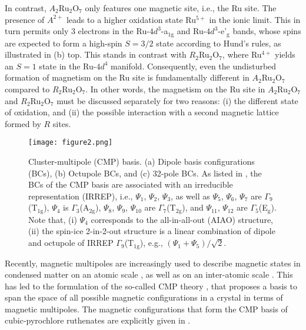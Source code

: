 \documentclass[10pt]{iopart}
\begin{document}
In contrast, $A_2$Ru$_2$O$_7$ only features one magnetic site, i.e., the Ru site. 
The presence of $A^{2+}$ leads to a higher oxidation state Ru$^{5+}$ in the ionic limit. This in turn permits only $3$ electrons in the Ru-$4d^3$-a$_{1\mathrm{g}}$ and Ru-$4d^3$-e'$_\mathrm{g}$ bands, whose spins are expected to form a high-spin $S=3/2$ state according to Hund's rules, as illustrated in  (b) top. This stands in contrast with $R_2$Ru$_2$O$_7$, where Ru$^{4+}$ yields an $S=1$ state in the Ru-$4d^4$ manifold. Consequently, even the undisturbed formation of magnetism on the Ru site is fundamentally different in $A_2$Ru$_2$O$_7$ compared to $R_2$Ru$_2$O$_7$. In other words, the magnetism on the Ru site in $A_2$Ru$_2$O$_7$ and $R_2$Ru$_2$O$_7$ must be discussed separately for two reasons: (i) the different state of oxidation, and (ii) the possible interaction with a second magnetic lattice formed by $R$ sites. 

\begin{figure}
  \texttt{[image: figure2.png]}
  \caption{Cluster-multipole (CMP) basis. (a) Dipole basis configurations (BCs), (b) Octupole BCs, and (c) 32-pole BCs. As listed in , the BCs of the CMP basis are associated with an irreducible representation (IRREP), i.e., $\Psi_1$, $\Psi_2$, $\Psi_3$, as well as $\Psi_5$, $\Psi_6$, $\Psi_7$ are $\Gamma_9$(T$_{1\mathrm{g}}$), $\Psi_4$ is $\Gamma_3$(A$_{2\mathrm{g}}$), $\Psi_8$, $\Psi_9$, $\Psi_{10}$ are $\Gamma_7$(T$_{2\mathrm{g}}$), and  $\Psi_{11}$, $\Psi_{12}$ are $\Gamma_5$(E$_{\mathrm{g}}$). Note that, (i) $\Psi_4$ corresponds to the all-in-all-out (AIAO) structure, (ii) the spin-ice 2-in-2-out structure is a linear combination of dipole and octupole of IRREP $\Gamma_9$(T$_{1\mathrm{g}}$), e.g., $(\Psi_1+\Psi_5)/\sqrt{2}$.
  \label{fig:2}
  }
\end{figure}

Recently, magnetic multipoles are increasingly used to describe magnetic states in condensed matter on an atomic scale \cite{kusunose2008description,santini2009multipolar,hayami2018classification,hayami2018microscopic}, as well as on an inter-atomic scale \cite{dubovik1990toroid,hayami2016emergent,suzuki2017cluster,suzuki2018first,huyen2019topology,hayami2021essential}. This 
has led to the formulation of the so-called CMP theory \cite{suzuki2019multipole}, that proposes a basis to span the space of all possible magnetic configurations in a crystal in terms of magnetic multipoles. The magnetic configurations that form the CMP basis of cubic-pyrochlore ruthenates are explicitly given in . 
\end{document}
